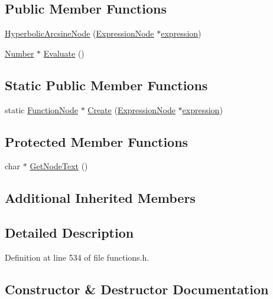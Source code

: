 \subsection*{Public Member Functions}
\begin{DoxyCompactItemize}
\item 
\hyperlink{classHyperbolicArcsineNode_abc5efe8b4f86817a3bf4a20a87c91c84}{Hyperbolic\+Arcsine\+Node} (\hyperlink{classExpressionNode}{Expression\+Node} $\ast$\hyperlink{classFunctionNode_ad7577b179a1937aaf8a0058bb5b546dc}{expression})
\item 
\hyperlink{structNumber}{Number} $\ast$ \hyperlink{classHyperbolicArcsineNode_a51381b2347b180568af5c26b283156c2}{Evaluate} ()
\end{DoxyCompactItemize}
\subsection*{Static Public Member Functions}
\begin{DoxyCompactItemize}
\item 
static \hyperlink{classFunctionNode}{Function\+Node} $\ast$ \hyperlink{classHyperbolicArcsineNode_a1694894ddaa623e53260fd2dfd029415}{Create} (\hyperlink{classExpressionNode}{Expression\+Node} $\ast$\hyperlink{classFunctionNode_ad7577b179a1937aaf8a0058bb5b546dc}{expression})
\end{DoxyCompactItemize}
\subsection*{Protected Member Functions}
\begin{DoxyCompactItemize}
\item 
char $\ast$ \hyperlink{classHyperbolicArcsineNode_acf539ab01fb398c7433e22e4ebf9be14}{Get\+Node\+Text} ()
\end{DoxyCompactItemize}
\subsection*{Additional Inherited Members}


\subsection{Detailed Description}


Definition at line 534 of file functions.\+h.



\subsection{Constructor \& Destructor Documentation}

